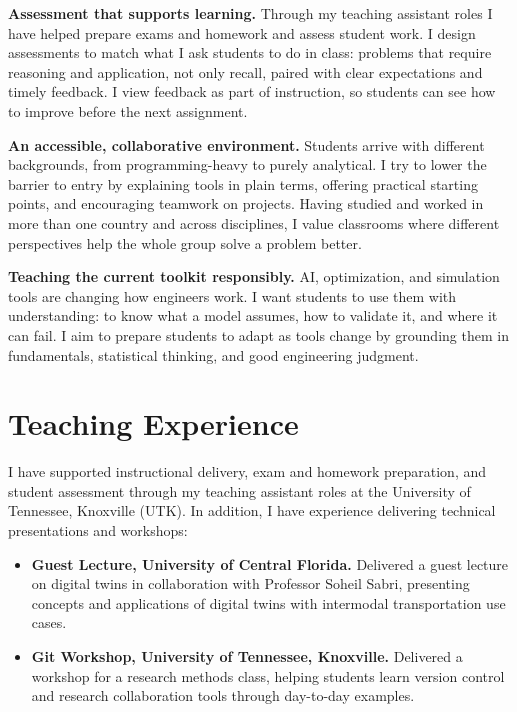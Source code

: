 \documentclass[10pt,letterpaper]{article}
\begin{document}
\textbf{Assessment that supports learning.} Through my teaching assistant roles I have helped prepare exams and homework and assess student work. I design assessments to match what I ask students to do in class: problems that require reasoning and application, not only recall, paired with clear expectations and timely feedback. I view feedback as part of instruction, so students can see how to improve before the next assignment.

\textbf{An accessible, collaborative environment.} Students arrive with different backgrounds, from programming-heavy to purely analytical. I try to lower the barrier to entry by explaining tools in plain terms, offering practical starting points, and encouraging teamwork on projects. Having studied and worked in more than one country and across disciplines, I value classrooms where different perspectives help the whole group solve a problem better.

\textbf{Teaching the current toolkit responsibly.} AI, optimization, and simulation tools are changing how engineers work. I want students to use them with understanding: to know what a model assumes, how to validate it, and where it can fail. I aim to prepare students to adapt as tools change by grounding them in fundamentals, statistical thinking, and good engineering judgment.

\section{Teaching Experience}

I have supported instructional delivery, exam and homework preparation, and student assessment through my teaching assistant roles at the University of Tennessee, Knoxville (UTK). In addition, I have experience delivering technical presentations and workshops:

\begin{itemize}
\item \textbf{Guest Lecture, University of Central Florida.} Delivered a guest lecture on digital twins in collaboration with Professor Soheil Sabri, presenting concepts and applications of digital twins with intermodal transportation use cases.
\item \textbf{Git Workshop, University of Tennessee, Knoxville.} Delivered a workshop for a research methods class, helping students learn version control and research collaboration tools through day-to-day examples.
\end{itemize}
\end{document}
